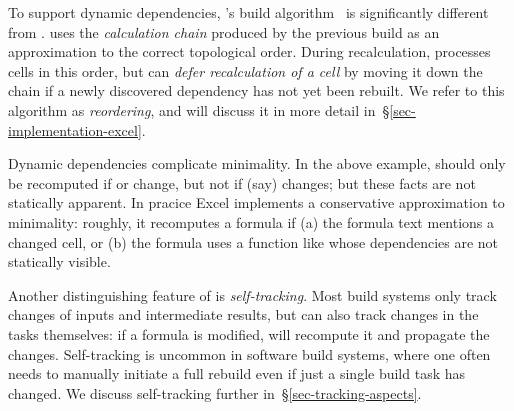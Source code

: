 To support dynamic dependencies,
\Excel's build algorithm~\cite{excel_recalc} is significantly different from
\Make. \Excel uses the \emph{calculation chain}
produced by the previous build as an approximation to the correct topological
order. During recalculation, \Excel processes cells in this order, but can
\emph{defer recalculation of a cell} by moving it down the chain if a newly
discovered dependency has not yet been rebuilt. We refer to this
algorithm as \emph{reordering}, and will discuss it in more detail
in~\S\ref{sec-implementation-excel}.

Dynamic dependencies complicate minimality.  In the above example,
 should only be recomputed if  or  change, but
not if (say)  changes; but these facts are not statically apparent.
In pracice Excel implements a conservative approximation to
minimality: roughly, it recomputes a formula if (a) the formula
text mentions a changed cell, or (b) the formula uses a function like 
whose dependencies are not statically visible.

Another distinguishing feature of \Excel is \emph{self-tracking}. Most build
systems only track changes of inputs and intermediate results, but \Excel can
also track changes in the tasks themselves: if a formula is modified, \Excel
will recompute it and propagate the changes. Self-tracking is uncommon in
software build systems, where one often needs to manually initiate a full
rebuild even if just a single build task has changed. We discuss
self-tracking further in~\S\ref{sec-tracking-aspects}.

